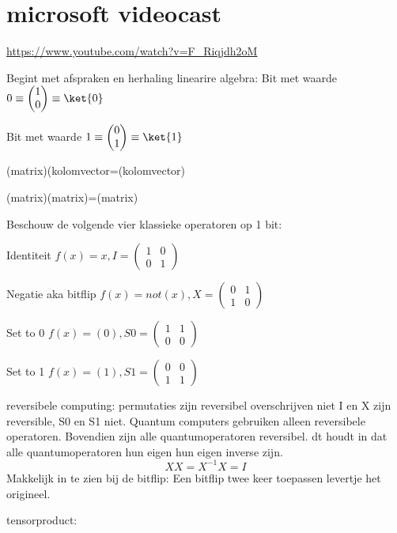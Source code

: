 


\section*{microsoft videocast}

\url{https://www.youtube.com/watch?v=F_Riqjdh2oM}

Begint met afspraken en herhaling linearire algebra:
Bit met waarde $0 \equiv \begin{pmatrix}
1\\
0
\end{pmatrix}
\equiv
\ket{0}$

Bit met waarde $1 \equiv 
\begin{pmatrix}
0\\
1
\end{pmatrix}
\equiv
\ket{1}$

(matrix)(kolomvector=(kolomvector)

(matrix)(matrix)=(matrix)

Beschouw de volgende vier klassieke operatoren op 1 bit:

Identiteit
$f(x)=x, 
I=\begin{pmatrix}
1&0\\
0&1
\end{pmatrix}
$

Negatie aka bitflip
$f(x)=not(x), X=\begin{pmatrix}
0&1\\
1&0
\end{pmatrix}
$

Set to 0
$f(x)=(0), S0=\begin{pmatrix}
1&1\\
0&0
\end{pmatrix}
$

Set to 1
$f(x)=(1), S1=\begin{pmatrix}
0&0\\
1&1
\end{pmatrix}
$

reversibele computing:
permutaties zijn reversibel overschrijven niet
I en X zijn reversible, S0 en S1 niet.
Quantum computers gebruiken alleen reversibele operatoren. Bovendien zijn alle quantumoperatoren reversibel. dt houdt in dat alle quantumoperatoren hun eigen  hun eigen inverse zijn.
$$XX=X^{-1}X=I$$
Makkelijk in te zien bij de bitflip: Een bitflip twee keer toepassen levertje het origineel.

tensorproduct:

